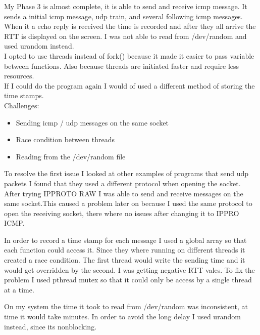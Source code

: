 \documentclass[12pt,a4paper]{article}
\author{Javier Pimentel}
\begin{document}
	
	My Phase 3 is almost complete, it is able to send and receive icmp message. It sends a initial icmp message, udp train, and several following icmp messages. When it a echo reply is received the time is recorded and after they all arrive the RTT is displayed on the screen. I was not able to read from /dev/random and used urandom instead. \\
	
	I opted to use threads instead of fork() because it made it easier to pass variable between functions. Also because threads are initiated faster and require less resources. \\
	
	If I could do the program again I would of used a different method of storing the time stamps.\\
	
Challenges:
\begin{itemize}
	\item Sending icmp / udp messages on the same socket
	\item Race condition between threads
	\item Reading from the /dev/random file
\end{itemize}

To resolve the first issue I looked at other examples of programs that send udp packets I found that they used a different protocol when opening the socket. After trying IPPROTO RAW I was able to send and receive messages on the same socket.This caused a problem later on because I used the same protocol to open the receiving socket, there where no issues after changing it to IPPRO ICMP.

In order to record a time stamp for each message I used a global array so that each function could access it. Since they where running on different threads it created a race condition. The first thread would write the sending time and it would get overridden by the second. I was getting negative RTT vales. To fix the problem I used pthread mutex so that it could only be access by a single thread at a time. 

On my system the time it took to read from /dev/random was inconsistent, at time it would take minutes. In order to avoid the long delay I used urandom instead, since its nonblocking.
\end{document}
